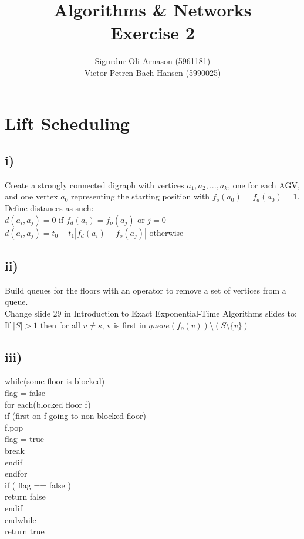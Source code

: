 \documentclass[a4paper]{article}
\author{Sigurdur Oli Arnason (5961181) \\ Victor Petren Bach Hansen (5990025)}
\title{Algorithms \& Networks \\ Exercise 2}
\begin{document}
\maketitle
\section{Lift Scheduling}

\subsection*{i)}
Create a strongly connected digraph with vertices $a_1, a_2, ..., a_k$, one for each AGV, and one vertex $a_0$ representing the starting position with $f_o(a_0) = f_d(a_0) = 1$. Define distances as such: \\
$d(a_i, a_j) = 0$ if $f_d(a_i) = f_o(a_j)$ or $j = 0$ \\
$d(a_i, a_j) = t_0 + t_1|f_d(a_i) - f_o(a_j)|$ otherwise \\

\subsection*{ii)}
Build queues for the floors with an operator to remove a set of vertices from a queue.\\
Change slide 29 in Introduction to Exact Exponential-Time Algorithms slides to:\\
If $|S|>1$ then for all $v \neq s$, v is first in $queue(f_o(v))\setminus(S \setminus \{v\})$
\subsection*{iii)}
while(some floor is blocked)\\
\indent flag = false\\
\indent for each(blocked floor f)\\
\indent \indent if (first on f going to non-blocked floor) \\
\indent\indent\indent f.pop \\
\indent\indent\indent flag = true \\
\indent\indent\indent break \\
\indent\indent endif\\
\indent endfor\\
\indent if ( flag == false ) \\
\indent\indent return false \\
\indent endif\\
endwhile \\
return true
\end{document}
